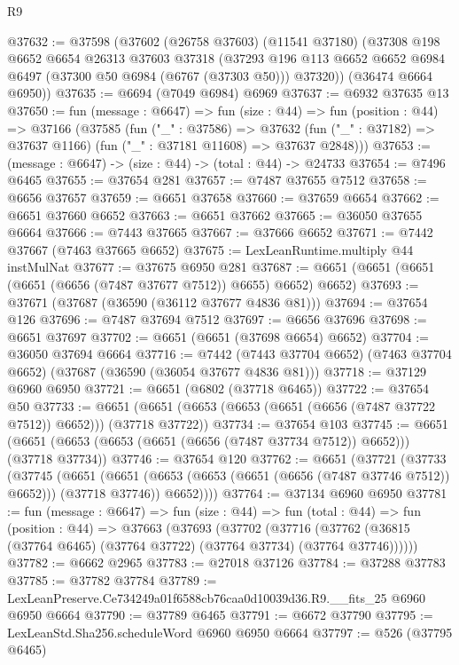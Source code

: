 \begin{lexlean}{R9}
\begin{coremodule}
@37632 := @37598
    (@37602
      (@26758 @37603)
      (@11541 @37180)
      (@37308
        @198
        @6652
        @6654
        @26313
        @37603
        @37318
        (@37293 @196 @113 @6652 @6652 @6984 @6497 (@37300 @50 @6984 (@6767 (@37303 @50))) @37320))
      (@36474 @6664 @6950))
@37635 := @6694 (@7049 @6984) @6969
@37637 := @6932 @37635 @13
@37650 := fun (message : @6647) =>
  fun (size : @44) =>
  fun (position : @44) =>
  @37166
    (@37585
      (fun ("_" : @37586) =>
      @37632 (fun ("_" : @37182) => @37637 @1166) (fun ("_" : @37181 @11608) => @37637 @2848)))
@37653 := (message : @6647) -> (size : @44) -> (total : @44) -> @24733
@37654 := @7496 @6465
@37655 := @37654 @281
@37657 := @7487 @37655 @7512
@37658 := @6656 @37657
@37659 := @6651 @37658
@37660 := @37659 @6654
@37662 := @6651 @37660 @6652
@37663 := @6651 @37662
@37665 := @36050 @37655 @6664
@37666 := @7443 @37665
@37667 := @37666 @6652
@37671 := @7442 @37667 (@7463 @37665 @6652)
@37675 := LexLeanRuntime.multiply @44 instMulNat
@37677 := @37675 @6950 @281
@37687 := @6651 (@6651 (@6651 (@6651 (@6656 (@7487 @37677 @7512)) @6655) @6652) @6652)
@37693 := @37671 (@37687 (@36590 (@36112 @37677 @4836 @81)))
@37694 := @37654 @126
@37696 := @7487 @37694 @7512
@37697 := @6656 @37696
@37698 := @6651 @37697
@37702 := @6651 (@6651 (@37698 @6654) @6652)
@37704 := @36050 @37694 @6664
@37716 := @7442
    (@7443 @37704 @6652)
    (@7463 @37704 @6652)
    (@37687 (@36590 (@36054 @37677 @4836 @81)))
@37718 := @37129 @6960 @6950
@37721 := @6651 (@6802 (@37718 @6465))
@37722 := @37654 @50
@37733 := @6651 (@6651 (@6653 (@6653 (@6651 (@6656 (@7487 @37722 @7512)) @6652))) (@37718 @37722))
@37734 := @37654 @103
@37745 := @6651 (@6651 (@6653 (@6653 (@6651 (@6656 (@7487 @37734 @7512)) @6652))) (@37718 @37734))
@37746 := @37654 @120
@37762 := @6651
    (@37721
      (@37733
        (@37745
          (@6651
            (@6651 (@6653 (@6653 (@6651 (@6656 (@7487 @37746 @7512)) @6652))) (@37718 @37746))
            @6652))))
@37764 := @37134 @6960 @6950
@37781 := fun (message : @6647) =>
  fun (size : @44) =>
  fun (total : @44) =>
  fun (position : @44) =>
  @37663
    (@37693
      (@37702
        (@37716 (@37762 (@36815 (@37764 @6465) (@37764 @37722) (@37764 @37734) (@37764 @37746))))))
@37782 := @6662 @2965
@37783 := @27018 @37126
@37784 := @37288 @37783
@37785 := @37782 @37784
@37789 := LexLeanPreserve.Ce734249a01f6588cb76caa0d10039d36.R9.__fits_25 @6960 @6950 @6664
@37790 := @37789 @6465
@37791 := @6672 @37790
@37795 := LexLeanStd.Sha256.scheduleWord @6960 @6950 @6664
@37797 := @526 (@37795 @6465)

\end{coremodule}
\end{lexlean}
